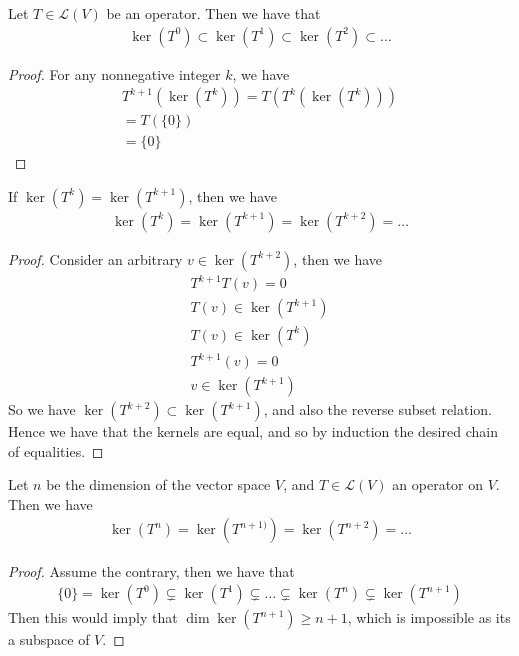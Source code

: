 \documentclass[]{article}
\begin{document}
\begin{thm}
		Let $T \in \mathcal{L}(V)$ be an operator. Then we have that
		\begin{align*}
				\ker(T^0) \subset \ker(T^1) \subset \ker(T^2) \subset \ldots
		\end{align*}
\end{thm}

\begin{proof}
		For any nonnegative integer $k$, we have
		\begin{align*}
				T^{k+1}(\ker(T^k)) = T(T^k(\ker(T^k))) \\
				= T(\{0\}) \\
				= \{0\}
		\end{align*}
\end{proof}

\begin{thm}
		If $\ker(T^k) = \ker(T^{k+1})$, then we have
		\begin{align*}
				\ker(T^k) = \ker(T^{k+1}) = \ker(T^{k+2}) = \ldots
		\end{align*}
\end{thm}

\begin{proof}
		Consider an arbitrary $v \in \ker(T^{k+2})$, then we have
		\begin{align*}
				T^{k+1}T(v) = 0 \\
				T(v) \in \ker(T^{k+1}) \\
				T(v) \in \ker(T^k) \\
		T^{k+1}(v) = 0 \\
				v \in \ker(T^{k+1})
		\end{align*}
		So we have $\ker(T^{k+2}) \subset \ker(T^{k+1})$, and also the reverse subset relation. Hence we have that the kernels are equal, and so by induction the desired chain of equalities.
\end{proof}

\begin{thm}
		Let $n$ be the dimension of the vector space $V$, and $T \in \mathcal{L}(V)$ an operator on $V$. Then we have
		\begin{align*}
				\ker(T^n) = \ker(T^{n+1)}) = \ker(T^{n+2}) = \ldots
		\end{align*}
\end{thm}

\begin{proof}
		Assume the contrary, then we have that
		\begin{align*}
				\{0\} = \ker(T^0) \subsetneq \ker(T^1) \subsetneq \ldots \subsetneq \ker(T^n) \subsetneq \ker(T^{n+1})
		\end{align*}
		Then this would imply that $\dim \ker(T^{n+1}) \geq n + 1$, which is impossible as its a subspace of $V$.
\end{proof}
\end{document}
